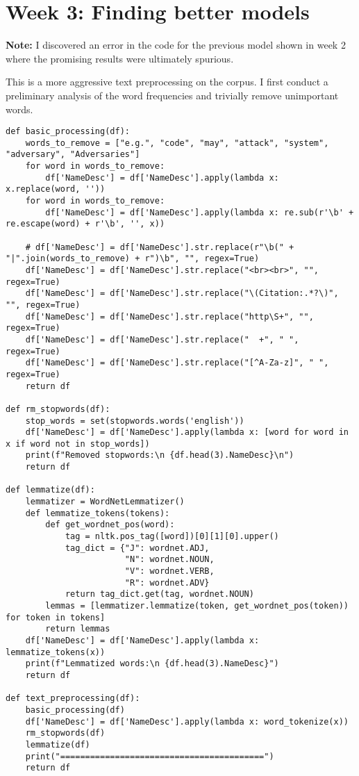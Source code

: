 \section*{Week 3: Finding better models}

\textbf{Note: }I discovered an error in the code for the previous model shown in week 2 where the promising results were ultimately spurious.

This is a more aggressive text preprocessing on the corpus. I first conduct a preliminary analysis of the word frequencies and trivially remove unimportant words.
\begin{lstlisting}[frame=single]
def basic_processing(df):
    words_to_remove = ["e.g.", "code", "may", "attack", "system", "adversary", "Adversaries"]
    for word in words_to_remove:
        df['NameDesc'] = df['NameDesc'].apply(lambda x: x.replace(word, ''))
    for word in words_to_remove:
        df['NameDesc'] = df['NameDesc'].apply(lambda x: re.sub(r'\b' + re.escape(word) + r'\b', '', x))

    # df['NameDesc'] = df['NameDesc'].str.replace(r"\b(" + "|".join(words_to_remove) + r")\b", "", regex=True)
    df['NameDesc'] = df['NameDesc'].str.replace("<br><br>", "", regex=True)
    df['NameDesc'] = df['NameDesc'].str.replace("\(Citation:.*?\)", "", regex=True)
    df['NameDesc'] = df['NameDesc'].str.replace("http\S+", "", regex=True)
    df['NameDesc'] = df['NameDesc'].str.replace("  +", " ", regex=True)
    df['NameDesc'] = df['NameDesc'].str.replace("[^A-Za-z]", " ", regex=True)
    return df

def rm_stopwords(df):
    stop_words = set(stopwords.words('english'))
    df['NameDesc'] = df['NameDesc'].apply(lambda x: [word for word in x if word not in stop_words])
    print(f"Removed stopwords:\n {df.head(3).NameDesc}\n")
    return df

def lemmatize(df):
    lemmatizer = WordNetLemmatizer()
    def lemmatize_tokens(tokens):
        def get_wordnet_pos(word):
            tag = nltk.pos_tag([word])[0][1][0].upper()
            tag_dict = {"J": wordnet.ADJ,
                        "N": wordnet.NOUN,
                        "V": wordnet.VERB,
                        "R": wordnet.ADV}
            return tag_dict.get(tag, wordnet.NOUN)
        lemmas = [lemmatizer.lemmatize(token, get_wordnet_pos(token)) for token in tokens]
        return lemmas
    df['NameDesc'] = df['NameDesc'].apply(lambda x: lemmatize_tokens(x))
    print(f"Lemmatized words:\n {df.head(3).NameDesc}")
    return df

def text_preprocessing(df):
    basic_processing(df)
    df['NameDesc'] = df['NameDesc'].apply(lambda x: word_tokenize(x))
    rm_stopwords(df)
    lemmatize(df)
    print("=========================================")
    return df
\end{lstlisting}

